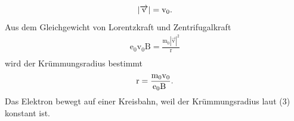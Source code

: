  \begin{equation}
    |\overrightarrow{\text{v}}| = \text{v}_0.\\
   \end{equation} 
\noindent Aus dem Gleichgewicht von Lorentzkraft und Zentrifugalkraft
\begin{align*}
    \text{e}_0  \text{v}_0 \text{B} = \frac{\text{m}_0 {|\overrightarrow{\text{v}}|}^2}{\text{r}}\\  
\end{align*}
\noindent wird der Krümmungsradius bestimmt
\begin{equation}
    \text{r} = \frac{\text{m}_0 \text{v}_0 }{\text{e}_0 \text{B }}.\\
\end{equation} 
\noindent Das Elektron bewegt auf einer Kreisbahn, weil der Krümmungsradius laut (3) konstant ist.


